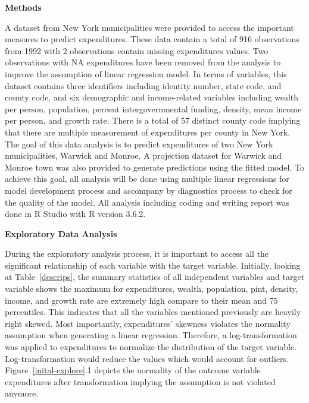 \documentclass[11pt]{article}\usepackage[]{graphicx}\usepackage[]{color}
\begin{document}
\noindent\textbf{Methods} 

\noindent A dataset from New York municipalities were provided to access the important measures to predict expenditures. These data contain a total of 916 observations from 1992 with 2 observations contain missing expenditures values. Two observations with NA expenditures have been removed from the analysis to improve the assumption of linear regression model. In terms of variables, this dataset contains three identifiers including identity number, state code, and county code, and six demographic and income-related variables including wealth per person, population, percent intergovernmental funding, density, mean income per person, and growth rate. There is a total of 57 distinct county code implying that there are multiple measurement of expenditures per county in New York. The goal of this data analysis is to predict expenditures of two New York municipalities, Warwick and Monroe. A projection dataset for Warwick and Monroe town was also provided to generate predictions using the fitted model. To achieve this goal, all analysis will be done using multiple linear regressions for model development process and accompany by diagnostics process to check for the quality of the model. All analysis including coding and writing report was done in R Studio with R version 3.6.2.     
\hfill \break

\noindent\textbf{Exploratory Data Analysis} 

\noindent During the exploratory analysis process, it is important to access all the significant relationship of each variable with the target variable. Initially, looking at Table~\ref{descrips}, the summary statistics of all independent variables and target variable shows the maximum for expenditures, wealth, population, pint, density, income, and growth rate are extremely high compare to their mean and 75 percentiles. This indicates that all the variables mentioned previously are heavily right skewed. Most importantly, expenditures’ skewness violates the normality assumption when generating a linear regression. Therefore, a log-transformation was applied to expenditures to normalize the distribution of the target variable. Log-transformation would reduce the values which would account for outliers. Figure~\ref{inital-explore}.1 depicts the normality of the outcome variable expenditures after transformation implying the assumption is not violated anymore.
\end{document}
